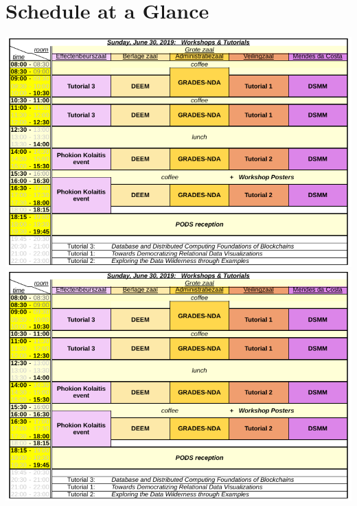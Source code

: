 
\clearpage
\ifodd\value{page}\hbox{}\newpage\fi

\section{Schedule at a Glance}

\vspace*{-.04\textheight}%
\ifodd\value{page}
\includegraphics[height=\textwidth,width=.97\textheight,angle=90]{schedule/p1.pdf}%
\else
\includegraphics[height=\textwidth,width=.97\textheight,angle=270]{schedule/p1.pdf}%
\fi

